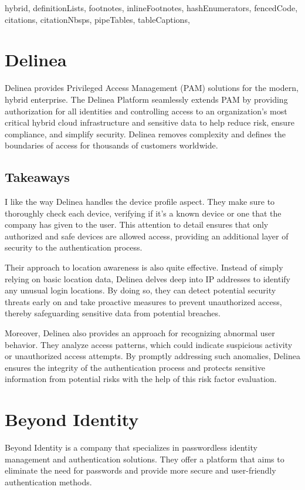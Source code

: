 \documentclass[
  digital,     %
  oneside,     %
  nosansbold,  %
  nocolorbold, %
  lof,         %
  lot,         %
]{fithesis4}
\begin{document}
\begin{markdown*}{%
  hybrid,
  definitionLists,
  footnotes,
  inlineFootnotes,
  hashEnumerators,
  fencedCode,
  citations,
  citationNbsps,
  pipeTables,
  tableCaptions,
}
\newpage
\section{Delinea}

Delinea provides Privileged Access Management (PAM) solutions for the modern, hybrid enterprise.
The Delinea Platform seamlessly extends PAM by providing authorization for all identities and controlling access to an organization’s most critical hybrid cloud infrastructure and sensitive data to help reduce risk, ensure compliance, and simplify security.
Delinea removes complexity and defines the boundaries of access for thousands of customers worldwide.

\subsection{Takeaways}
I like the way Delinea handles the device profile aspect.
They make sure to thoroughly check each device, verifying if it's a known device or one that the company has given to the user. This attention to detail ensures that only authorized and safe devices are allowed access, providing an additional layer of security to the authentication process.

Their approach to location awareness is also quite effective.
Instead of simply relying on basic location data, Delinea delves deep into IP addresses to identify any unusual login locations. By doing so, they can detect potential security threats early on and take proactive measures to prevent unauthorized access, thereby safeguarding sensitive data from potential breaches.

Moreover, Delinea also provides an approach for recognizing abnormal user behavior.
They analyze access patterns, which could indicate suspicious activity or unauthorized access attempts.
By promptly addressing such anomalies, Delinea ensures the integrity of the authentication process and protects sensitive information from potential risks with the help of this risk factor evaluation. \cite{existing-delinea}


\section{Beyond Identity}

Beyond Identity is a company that specializes in passwordless identity management and authentication solutions. They offer a platform that aims to eliminate the need for passwords and provide more secure and user-friendly authentication methods.


\end{markdown*}
\end{document}

